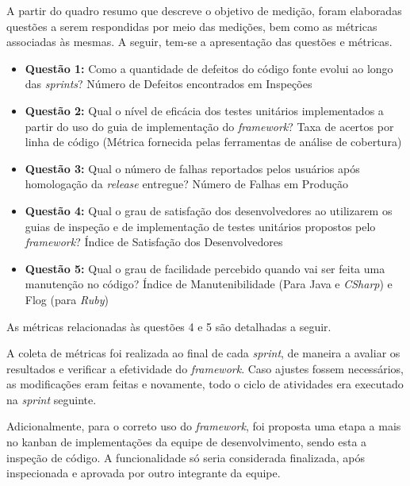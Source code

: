 \hfill \break

\hfill \break

A partir do quadro resumo que descreve o objetivo de medição, foram elaboradas questões a serem respondidas por meio das medições, bem como as métricas associadas às mesmas. A seguir, tem-se a apresentação das questões e métricas.

\begin{itemize}
	\item \textbf{Questão 1:} Como a quantidade de defeitos do código fonte evolui ao longo das \textit{sprints}?
	\subitem Número de Defeitos encontrados em Inspeções

	\item \textbf{Questão 2:} Qual o nível de eficácia dos testes unitários implementados a partir do uso do guia de implementação do \textit{framework}?
	\subitem Taxa de acertos por linha de código (Métrica fornecida pelas ferramentas de análise de cobertura)

	\item \textbf{Questão 3:} Qual o número de falhas reportados pelos usuários após homologação da \textit{release} entregue?
	\subitem Número de Falhas em Produção

	\item \textbf{Questão 4:} Qual o grau de satisfação dos desenvolvedores ao utilizarem os guias de inspeção e de implementação de testes unitários propostos pelo \textit{framework}?
	\subitem Índice de Satisfação dos Desenvolvedores

	\item \textbf{Questão 5:} Qual o grau de facilidade percebido quando vai ser feita uma manutenção no código?
	\subitem Índice de Manutenibilidade (Para Java e \textit{CSharp}) e Flog (para \textit{Ruby})
\end{itemize}

As métricas relacionadas às questões 4 e 5 são detalhadas a seguir.

A coleta de métricas foi realizada ao final de cada \textit{sprint}, de maneira a avaliar os resultados e verificar a efetividade do \textit{framework}. Caso ajustes fossem necessários, as modificações eram feitas e novamente, todo o ciclo de atividades era executado na \textit{sprint} seguinte.

Adicionalmente, para o correto uso do \textit{framework}, foi proposta uma etapa a mais no kanban de implementações da equipe de desenvolvimento, sendo esta a inspeção de código. A funcionalidade só seria considerada finalizada, após inspecionada e aprovada por outro integrante da equipe.

